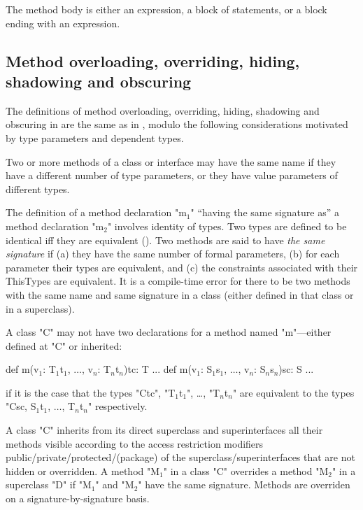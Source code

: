 The method body is either an expression, a block of statements,
or a block ending with an expression.


\subsection{Method overloading, overriding, hiding, shadowing and obscuring}

The definitions of method overloading, overriding, hiding, shadowing
and obscuring in \Xten{} are the same as in \Java, modulo the following
considerations motivated by type parameters and dependent types.

Two or more methods of a class or interface may have the same
name if they have a different number of type parameters, or
they have value parameters of different types.

The definition of a method declaration \xcdmath"m$_1$" ``having the same signature
as'' a method declaration \xcdmath"m$_2$" involves identity of types. Two \Xten{} types
are defined to be identical iff they are equivalent ().
Two methods are said to have {\em the same signature} if (a)
they have the same number of formal parameters, (b) for each parameter
their types are equivalent, and (c) the constraints associated with
their ThisTypes are equivalent. It is a compile-time error for there
to be two methods with the same name and same signature in a class
(either defined in that class or in a superclass).

\begin{staticrule*}
  A class \xcd"C" may not have two declarations for a method named \xcd"m"---either
  defined at \xcd"C" or inherited:
\begin{xtenmath}
def m(v$_1$: T$_1${t$_1$}, $\dots$, v$_n$: T$_n${t$_n$}){tc}: T {...}
def m(v$_1$: S$_1${s$_1$}, $\dots$, v$_n$: S$_n${s$_n$}){sc}: S {...}
\end{xtenmath}
\noindent
if it is the case that the types \xcd"C{tc}", \xcdmath"T$_1${t$_1$}",
\dots, \xcdmath"T$_n${t$_n$}" are
equivalent to the types \xcdmath"C{sc}, S$_1${t$_1$}, $\dots$, T$_n${t$_n$}"
respectively.
\end{staticrule*}

A class \xcd"C" inherits from its direct superclass and superinterfaces all
their methods visible according to the access restriction modifiers
public/private/protected/(package) of the superclass/superinterfaces
that are not hidden or overridden. A method \xcdmath"M$_1$" in a class
\xcd"C" overrides
a method \xcdmath"M$_2$" in a superclass \xcd"D" if
\xcdmath"M$_1$" and \xcdmath"M$_2$" have the same signature.
Methods are overriden on a signature-by-signature basis.


